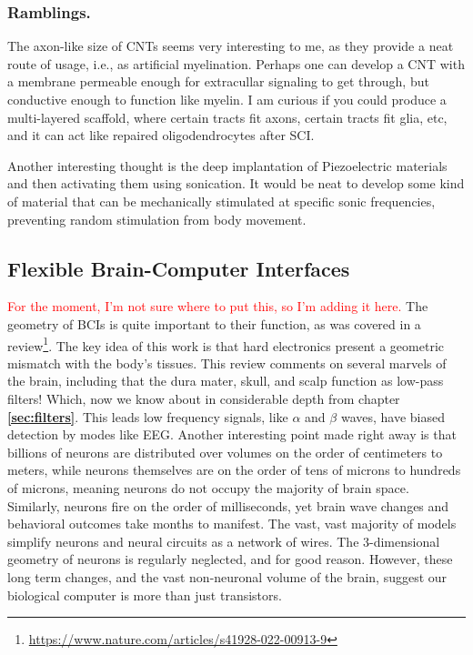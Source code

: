 \subsubsection{Ramblings.}
The axon-like size of CNTs seems very interesting to me, as they provide a neat route of usage, i.e., as artificial myelination. Perhaps one can develop a CNT with a membrane permeable enough for extracullar signaling to get through, but conductive enough to function like myelin. I am curious if you could produce a multi-layered scaffold, where certain tracts fit axons, certain tracts fit glia, etc, and it can act like repaired oligodendrocytes after SCI.\newline

Another interesting thought is the deep implantation of Piezoelectric materials and then activating them using sonication. It would be neat to develop some kind of material that can be mechanically stimulated at specific sonic frequencies, preventing random stimulation from body movement. 

\subsection{Flexible Brain-Computer Interfaces}

\textcolor{red}{For the moment, I'm not sure where to put this, so I'm adding it here.} The geometry of BCIs is quite important to their function, as was covered in a review\footnote{\url{https://www.nature.com/articles/s41928-022-00913-9}}. The key idea of this work is that hard electronics present a geometric mismatch with the body's tissues. This review comments on several marvels of the brain, including that the dura mater, skull, and scalp function as low-pass filters! Which, now we know about in considerable depth from chapter \textbf{\ref{sec:filters}}. This leads low frequency signals, like $\alpha$ and $\beta$ waves, have biased detection by modes like EEG. Another interesting point made right away is that billions of neurons are distributed over volumes on the order of centimeters to meters, while neurons themselves are on the order of tens of microns to hundreds of microns, meaning neurons do not occupy the majority of brain space. Similarly, neurons fire on the order of milliseconds, yet brain wave changes and behavioral outcomes take months to manifest. The vast, vast majority of models simplify neurons and neural circuits as a network of wires. The 3-dimensional geometry of neurons is regularly neglected, and for good reason. However, these long term changes, and the vast non-neuronal volume of the brain, suggest our biological computer is more than just transistors.\newline


